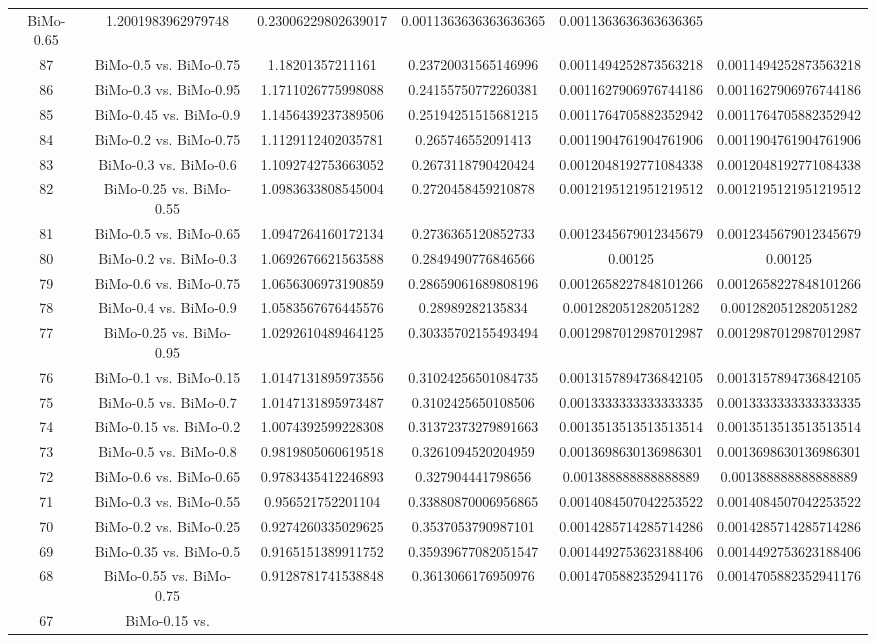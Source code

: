 \documentclass[a4paper,10pt]{article}
\begin{document}
\begin{landscape}
\begin{table}[!htp]
\begin{tabular}{cccccc}
BiMo-0.65&1.2001983962979748&0.23006229802639017&0.0011363636363636365&0.0011363636363636365\\87&BiMo-0.5 vs. BiMo-0.75&1.18201357211161&0.23720031565146996&0.0011494252873563218&0.0011494252873563218\\86&BiMo-0.3 vs. BiMo-0.95&1.1711026775998088&0.24155750772260381&0.0011627906976744186&0.0011627906976744186\\85&BiMo-0.45 vs. BiMo-0.9&1.1456439237389506&0.25194251515681215&0.0011764705882352942&0.0011764705882352942\\84&BiMo-0.2 vs. BiMo-0.75&1.1129112402035781&0.265746552091413&0.0011904761904761906&0.0011904761904761906\\83&BiMo-0.3 vs. BiMo-0.6&1.1092742753663052&0.2673118790420424&0.0012048192771084338&0.0012048192771084338\\82&BiMo-0.25 vs. BiMo-0.55&1.0983633808545004&0.2720458459210878&0.0012195121951219512&0.0012195121951219512\\81&BiMo-0.5 vs. BiMo-0.65&1.0947264160172134&0.2736365120852733&0.0012345679012345679&0.0012345679012345679\\80&BiMo-0.2 vs. BiMo-0.3&1.0692676621563588&0.2849490776846566&0.00125&0.00125\\79&BiMo-0.6 vs. BiMo-0.75&1.0656306973190859&0.28659061689808196&0.0012658227848101266&0.0012658227848101266\\78&BiMo-0.4 vs. BiMo-0.9&1.0583567676445576&0.28989282135834&0.001282051282051282&0.001282051282051282\\77&BiMo-0.25 vs. BiMo-0.95&1.0292610489464125&0.30335702155493494&0.0012987012987012987&0.0012987012987012987\\76&BiMo-0.1 vs. BiMo-0.15&1.0147131895973556&0.31024256501084735&0.0013157894736842105&0.0013157894736842105\\75&BiMo-0.5 vs. BiMo-0.7&1.0147131895973487&0.3102425650108506&0.0013333333333333335&0.0013333333333333335\\74&BiMo-0.15 vs. BiMo-0.2&1.0074392599228308&0.31372373279891663&0.0013513513513513514&0.0013513513513513514\\73&BiMo-0.5 vs. BiMo-0.8&0.9819805060619518&0.3261094520204959&0.0013698630136986301&0.0013698630136986301\\72&BiMo-0.6 vs. BiMo-0.65&0.9783435412246893&0.327904441798656&0.001388888888888889&0.001388888888888889\\71&BiMo-0.3 vs. BiMo-0.55&0.956521752201104&0.33880870006956865&0.0014084507042253522&0.0014084507042253522\\70&BiMo-0.2 vs. BiMo-0.25&0.9274260335029625&0.3537053790987101&0.0014285714285714286&0.0014285714285714286\\69&BiMo-0.35 vs. BiMo-0.5&0.9165151389911752&0.35939677082051547&0.0014492753623188406&0.0014492753623188406\\68&BiMo-0.55 vs. BiMo-0.75&0.9128781741538848&0.3613066176950976&0.0014705882352941176&0.0014705882352941176\\67&BiMo-0.15 vs. 
\end{tabular}
\end{table}
\end{landscape}
\end{document}

